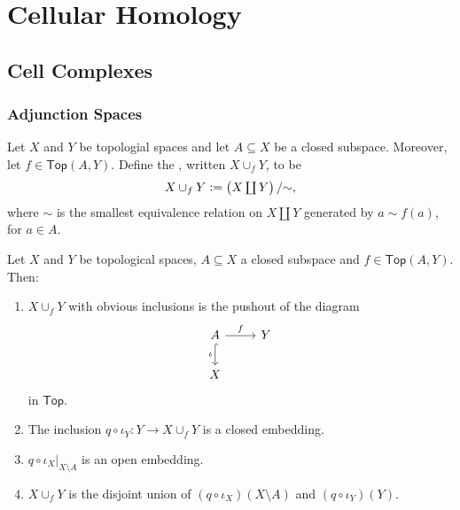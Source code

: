 \chapter{Cellular Homology}
\section*{Cell Complexes}
\subsection*{Adjunction Spaces}

\begin{definition}
	Let $X$ and $Y$ be topologial spaces and let $A \subseteq X$ be a closed subspace. Moreover, let $f \in \mathsf{Top}(A,Y)$. Define the , written $X \cup_f Y$, to be
	\begin{equation*}
		X \cup_f Y := \textstyle\del[1]{X \coprod Y}/{\sim},
	\end{equation*}
	\noindent where $\sim$ is the smallest equivalence relation on $X \coprod Y$ generated by $a {\sim} f(a)$, for $a \in A$.
\end{definition}

\begin{lemma}
	\label{lem:adjunction_space}
	Let $X$ and $Y$ be topological spaces, $A \subseteq X$ a closed subspace and $f \in \mathsf{Top}(A,Y)$. Then:
	\begin{enumerate}[label = \textup{(}\alph*\textup{)}]
		\item $X \cup_f Y$ with obvious inclusions is the pushout of the diagram
			\begin{equation*}
				\begin{tikzcd}
					A \arrow[d,hook,"\iota"']\arrow[r,"f"] & Y\\
					X
				\end{tikzcd}
			\end{equation*}
			\noindent in $\mathsf{Top}$.
		\item The inclusion $q \circ \iota_Y : Y \to X \cup_f Y$ is a closed embedding.
		\item $q \circ \iota_X\vert_{X \setminus A}$ is an open embedding.
		\item $X \cup_f Y$ is the disjoint union of $(q \circ \iota_X)(X \setminus A)$ and $(q \circ \iota_Y)(Y)$.
	\end{enumerate}
\end{lemma}

